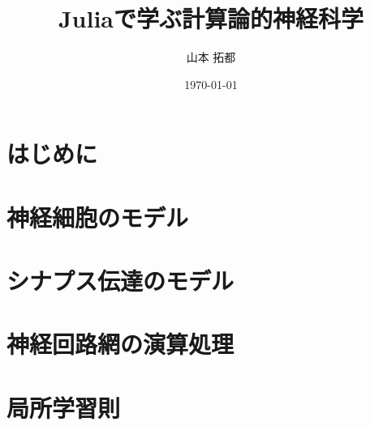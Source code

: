 \documentclass[titlepage]{ltjsbook}
\title{\Huge \textbf{Juliaで学ぶ計算論的神経科学}}
\author{\huge 山本 拓都}
\date{\huge \today}
\begin{document}
\maketitle

\setcounter{tocdepth}{2}
\tableofcontents
\clearpage
\chapter{はじめに}

\chapter{神経細胞のモデル}

% 
%  

\chapter{シナプス伝達のモデル}
% 
% 
% 
% 

\chapter{神経回路網の演算処理}

\chapter{局所学習則}
% 
% 
% 
\end{document}
